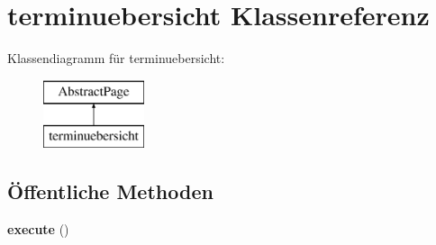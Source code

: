 \hypertarget{classterminuebersicht}{}\section{terminuebersicht Klassenreferenz}
\label{classterminuebersicht}
Klassendiagramm für terminuebersicht\+:\begin{figure}[H]
\begin{center}
\leavevmode
\includegraphics[height=2.000000cm]{classterminuebersicht}
\end{center}
\end{figure}
\subsection*{Öffentliche Methoden}
\begin{DoxyCompactItemize}
\item 
\mbox{\label{classterminuebersicht_a449f2ed48879d9a0047ec84dd0b9faad}} 
{\bfseries execute} ()
\end{DoxyCompactItemize}
